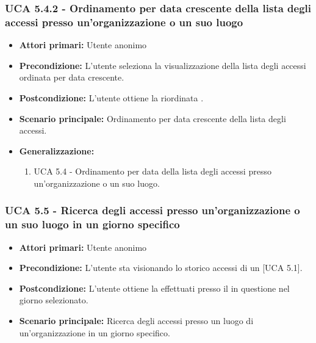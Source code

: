 \subsubsection{UCA 5.4.2 - Ordinamento per data crescente della lista degli accessi presso un'organizzazione o un suo luogo}
\begin{itemize}
    \item \textbf{Attori primari:} Utente anonimo
    \item \textbf{Precondizione:} L'utente seleziona la visualizzazione della lista degli accessi ordinata per data crescente.
    \item \textbf{Postcondizione:} L'utente ottiene la  riordinata .
    \item \textbf{Scenario principale:} Ordinamento per data crescente della lista degli accessi.
    \item \textbf{Generalizzazione:}
	\begin{enumerate}
		\item UCA 5.4 - Ordinamento per data della lista degli accessi presso un'organizzazione o un suo luogo.
	\end{enumerate}
\end{itemize}

\subsubsection{UCA 5.5 - Ricerca degli accessi presso un'organizzazione o un suo luogo in un giorno specifico}
\begin{itemize}
    \item \textbf{Attori primari:} Utente anonimo
    \item \textbf{Precondizione:} L'utente sta visionando lo storico accessi di un  [UCA 5.1].
    \item \textbf{Postcondizione:} L'utente ottiene la  effettuati presso il  in questione nel giorno selezionato.
    \item \textbf{Scenario principale:} Ricerca degli accessi presso un luogo di un'organizzazione in un giorno specifico.
\end{itemize}